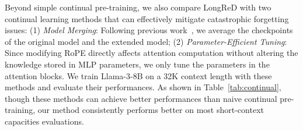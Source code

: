  Beyond simple continual pre-training, we also compare LongReD with two continual learning methods that can effectively mitigate catastrophic forgetting issues: (1) \emph{Model Merging}: Following previous work~\cite{hu-arxiv-2024-longrecipe}, we average the checkpoints of the original model and the extended model; (2) \emph{Parameter-Efficient Tuning}: Since modifying RoPE directly affects attention computation without altering the knowledge stored in MLP parameters, we only tune the parameters in the attention blocks. We train Llama-3-8B on a 32K context length with these methods and evaluate their performances. As shown in Table~\ref{tab:continual}, though these methods can achieve better performances than naive continual pre-training, our method consistently performs better on most short-context capacities evaluations. 

\begin{table}[htb]
    \centering
    \caption{Comparison with continual learning methods, where Merging denotes model merging and PET denotes parameter-efficient tuning. }
    \label{tab:continual}
\end{table}







